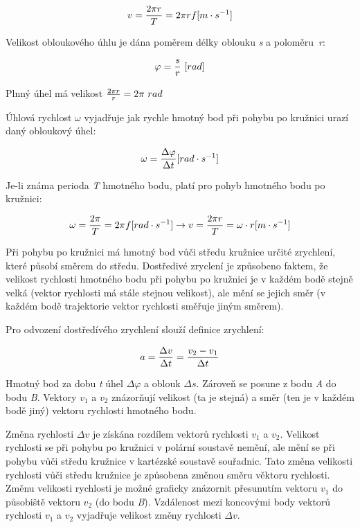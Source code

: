 $$ v = {{2\pi r}\over T} = 2 \pi r f [m\cdot s^{-1}]$$

Velikost obloukového úhlu je dána poměrem délky oblouku {\it s} a poloměru~{\it r}:

$$ \varphi = {s \over r}~[rad] $$

Plnný úhel má velikost $ {{2 \pi r}\over r} = 2 \pi~rad $ 

Úhlová rychlost $\omega$ vyjadřuje jak rychle hmotný bod při pohybu po kružnici urazí daný obloukový úhel:

$$ \omega = {\Delta\varphi \over \Delta t} [rad\cdot s^{-1}] $$

Je-li známa perioda {\it T} hmotného bodu, platí pro pohyb hmotného bodu po kružnici:

$$ \omega = {2\pi \over T} = 2\pi f [rad\cdot s^{-1}] \rightarrow v = {2\pi r\over T} = \omega\cdot r [m\cdot s^{-1}] $$


Při pohybu po kružnici má hmotný bod vůči středu kružnice určité zrychlení, které působí směrem do středu. Dostředivé zryclení je způsobeno faktem, že velikost rychlosti hmotného bodu při pohybu po kružnici je v každém bodě stejně velká (vektor rychlosti má stále stejnou velikost), ale mění se jejich směr (v každém bodě trajektorie vektor rychlosti směřuje jiným směrem). 

Pro odvození dostředívého zrychlení slouží definice zrychlení:

$$ a = {\Delta v \over \Delta t } = {{v_2 - v_1}\over \Delta t}$$

Hmotný bod za dobu {\it t} úhel $\Delta \varphi$ a oblouk $\Delta s$. Zároveň se posune z bodu {\it A} do bodu {\it B}. Vektory $v_1$ a $v_2$ znázorňují velikost (ta je stejná) a směr (ten je v každém bodě jiný) vektoru rychlosti hmotného bodu. 

Změna rychlosti $\Delta v$ je získána rozdílem vektorů rychlosti $v_1$ a $v_2$. Velikost rychlosti se při pohybu po kružnici v polární soustavě nemění, ale mění se při pohybu vůči středu kružnice v kartézské soustavě souřadnic. Tato změna velikosti rychlosti vůči středu kružnice je způsobena změnou směru věktoru rychlosti. Změnu velikosti rychlosti je možné graficky znázornit přesunutím vektoru $v_1$ do působiště vektoru $v_2$ (do bodu {\it B}). Vzdálenost mezi koncovými body vektorů rychlosti $v_1$ a $v_2$ vyjadřuje velikost změny rychlosti $\Delta v$.

\vskip 4mm
\centerline{}
\vskip 4mm

